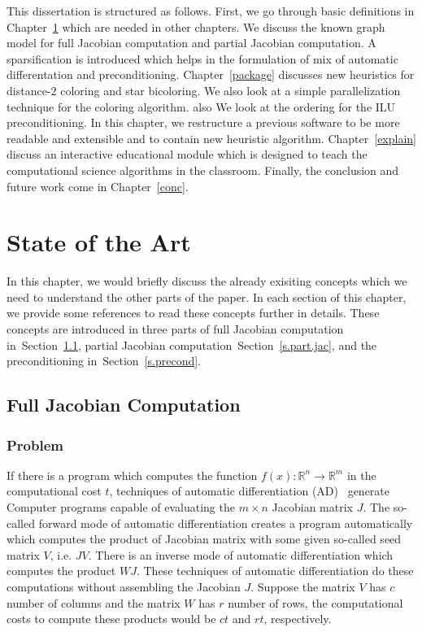 \documentclass[12pt, oneside]{book}
\newcommand{\secref}[1]{Section~\protect\ref{#1}}
\newcommand{\chapref}[1]{Chapter~\protect\ref{#1}}
\newcommand{\setR}{\ensuremath{\mathbb{R}}}
\newcommand{\col}{\ensuremath{c}}
\newcommand{\row}{\ensuremath{r}}
\begin{document}
This dissertation is structured as follows.
First, we go through basic definitions in \chapref{prel} which are needed in other chapters.
We discuss the known graph model for full Jacobian computation and partial Jacobian
computation. A sparsification is introduced which helps in the formulation of 
mix of automatic differentation and preconditioning.
\chapref{package} discusses new heuristics for distance-$2$ coloring and 
star bicoloring. We also look at a simple parallelization technique for the 
coloring algorithm. also We look at the ordering for the ILU preconditioning.
In this chapter, we restructure a previous software
to be more readable and extensible and to contain new heuristic algorithm.
\chapref{explain} discuss an interactive educational module
which is designed to teach the computational science algorithms in the classroom. 
Finally, the conclusion and future work come in \chapref{conc}.

\chapter{‌State of the Art}
\label{prel}
In this chapter, we would briefly discuss the already exisiting concepts which we need to understand
the other parts of the paper. In each section of this chapter, 
we provide some references to read these concepts further in details. 
These concepts are introduced in three parts of full Jacobian computation in~\secref{s.full.jac},
partial Jacobian computation~\secref{s.part.jac}, and the preconditioning in~\secref{s.precond}.
\section{Full Jacobian Computation}
\label{s.full.jac}

\subsection{Problem}
\label{ss.problem.full}
If there is a program which computes the function $f(x) : \setR^n \rightarrow \setR^m$
in the computational cost $t$,
techniques of automatic differentiation (AD)~\cite{Griewank2008EDP,Rall1981ADT} generate
Computer programs capable of evaluating the $m \times n$ Jacobian matrix $J$. 
The so-called forward mode of automatic differentiation creates a program automatically 
which computes the product of Jacobian matrix with some given so-called seed matrix $V$,
i.e. $JV$. There is an inverse mode of automatic differentiation which computes the product $WJ$. 
These techniques of automatic differentiation do these computations without assembling the Jacobian $J$. 
Suppose the matrix $V$ has $\col$ number of columns and the matrix $W$ has $\row$ number of rows, 
the computational costs to compute these products would be $\col t$ and $\row t$, respectively.
\end{document}
